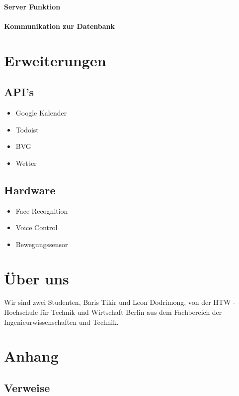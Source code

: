 \documentclass[a4paper,11pt]{article}
\begin{document}
\paragraph{Server Funktion}

\paragraph{Kommunikation zur Datenbank}

\section{Erweiterungen}
\subsection{API's}

\begin{itemize}
\item Google Kalender
\item Todoist
\item BVG
\item Wetter
\end{itemize}
\subsection{Hardware}
\begin{itemize}
\item Face Recognition
\item Voice Control
\item Bewegungssensor
\end{itemize}


\section{Über uns}
Wir sind zwei Studenten, Baris Tikir und Leon Dodrimong, von der HTW - Hochschule für
Technik und Wirtschaft Berlin aus dem Fachbereich der Ingenieurwissenschaften und
Technik. 

\section{Anhang}
\subsection{Verweise}
\end{document}
